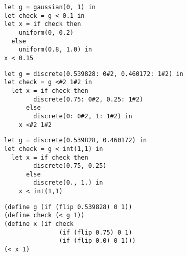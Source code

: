 
\newsavebox{\boxone}
\begin{lrbox}{\boxone}
\begin{minipage}{5.2cm}
\begin{lstlisting}
let g = gaussian(0, 1) in
let check = g < 0.1 in
let x = if check then
    uniform(0, 0.2)
  else
    uniform(0.8, 1.0) in
x < 0.15
\end{lstlisting}
\end{minipage}
\end{lrbox}

\newsavebox{\boxtwo}
\begin{lrbox}{\boxtwo}
\begin{minipage}{5.2cm}
\begin{lstlisting}
let g = discrete(0.539828: 0#2, 0.460172: 1#2) in
let check = g <#2 1#2 in
  let x = if check then
        discrete(0.75: 0#2, 0.25: 1#2)
      else
        discrete(0: 0#2, 1: 1#2) in
    x <#2 1#2
\end{lstlisting}
\end{minipage}
\end{lrbox}

\newsavebox{\boxthree}
\begin{lrbox}{\boxthree}
\begin{minipage}{5.2cm}
\begin{lstlisting}
let g = discrete(0.539828, 0.460172) in
let check = g < int(1,1) in
  let x = if check then
        discrete(0.75, 0.25)
      else
        discrete(0., 1.) in
    x < int(1,1)
\end{lstlisting}
\end{minipage}
\end{lrbox}

\newsavebox{\boxfour}
\begin{lrbox}{\boxfour}
\begin{minipage}{5.2cm}
\begin{lstlisting}
(define g (if (flip 0.539828) 0 1))
(define check (< g 1))
(define x (if check 
               (if (flip 0.75) 0 1) 
               (if (flip 0.0) 0 1)))
(< x 1)
\end{lstlisting}
\end{minipage}
\end{lrbox}


